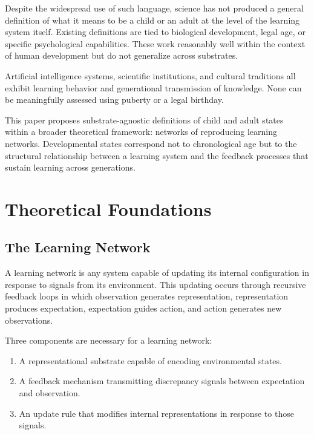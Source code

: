 \documentclass[11pt]{article}
\begin{document}
Despite the widespread use of such language, science has not produced a general definition
of what it means to be a child or an adult at the level of the learning system itself.
Existing definitions are tied to biological development, legal age, or specific psychological
capabilities. These work reasonably well within the context of human development but do not
generalize across substrates.

Artificial intelligence systems, scientific institutions, and cultural traditions all exhibit
learning behavior and generational transmission of knowledge. None can be meaningfully
assessed using puberty or a legal birthday.

This paper proposes substrate-agnostic definitions of child and adult states within a broader
theoretical framework: networks of reproducing learning networks. Developmental states
correspond not to chronological age but to the structural relationship between a learning
system and the feedback processes that sustain learning across generations.

\section{Theoretical Foundations}

\subsection{The Learning Network}

A learning network is any system capable of updating its internal configuration in response
to signals from its environment. This updating occurs through recursive feedback loops in
which observation generates representation, representation produces expectation, expectation
guides action, and action generates new observations.

Three components are necessary for a learning network:

\begin{enumerate}
    \item A representational substrate capable of encoding environmental states.
    \item A feedback mechanism transmitting discrepancy signals between expectation and
          observation.
    \item An update rule that modifies internal representations in response to those signals.
\end{enumerate}
\end{document}
